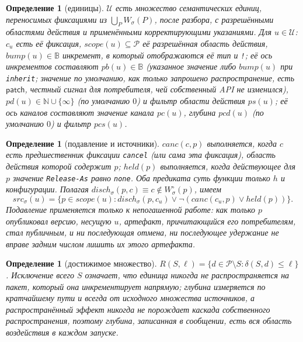 \documentclass[sigconf,nonacm]{acmart}
\theoremstyle{acmplain}
\theoremstyle{acmdefinition}
\newtheorem{definition}[theorem]{Определение}
\theoremstyle{acmplain}
\newcommand{\code}[1]{\texttt{#1}}
\begin{document}
\begin{definition}[единицы]
$\mathcal{U}$ есть множество семантических единиц, переносимых фиксациями из
$\bigcup_P W_\sigma(P)$, после разбора, с разрешёнными областями действия и применёнными
корректирующими указаниями. Для $u \in \mathcal{U}$: $c_u$ есть её фиксация,
$\mathit{scope}(u) \subseteq \mathcal{P}$ её разрешённая область действия,
$\mathit{bump}(u) \in \mathbb{B}$ инкремент, в который отображаются её тип и \code{!};
её ось инкрементов составляют $\mathit{pb}(u) \in \mathbb{B}$ (указанное значение либо
$\mathit{bump}(u)$ при \code{inherit}; значение по умолчанию, как только запрошено
распространение, есть $\mathsf{patch}$, честный сигнал для потребителя, чей
собственный API не изменился), $\mathit{pd}(u) \in \mathbb{N} \cup
\{\infty\}$ (по умолчанию $0$) и фильтр области действия $\mathit{ps}(u)$; её ось
каналов составляют значение канала $\mathit{pc}(u)$, глубина $\mathit{pcd}(u)$
(по умолчанию $0$) и фильтр $\mathit{pcs}(u)$.
\end{definition}

\begin{definition}[подавление и источники]
\label{def:src}
$\mathit{canc}(c,p)$ выполняется, когда $c$ есть предшественник фиксации
\code{cancel} (или сама эта фиксация), область действия которой содержит $p$; $\mathit{held}(p)$
выполняется, когда действующее для $p$ значение \code{Release-As} равно \code{none}. Оба предиката
суть функции только $h$ и конфигурации. Полагая $\mathit{disch}_\sigma(p,c)
\equiv c \notin W^\circ_\sigma(p)$, имеем
\begin{equation}
  \mathit{src}_\sigma(u) = \{ p \in \mathit{scope}(u) :
    \mathit{disch}_\sigma(p,c_u) \lor
    \lnot(\mathit{canc}(c_u,p) \lor \mathit{held}(p)) \}.
  \label{eq:src}
\end{equation}
Подавление применяется только к \emph{непогашенной} работе: как только $p$
опубликовал версию, несущую $u$, артефакт, причитающийся его потребителям,
стал публичным, и ни последующая отмена, ни последующее удержание не вправе задним числом
лишить их этого артефакта.
\end{definition}

\begin{definition}[достижимое множество]
\label{def:reach}
$R(S,\ell) = \{ d \in \mathcal{P} \setminus S : \delta(S,d) \leq \ell
\}$. Исключение всего $S$ означает, что единица никогда не распространяется на пакет,
который она инкрементирует напрямую; глубина измеряется по кратчайшему пути и всегда
от исходного множества источников, а распространённый эффект никогда не порождает
каскада собственного распространения, поэтому глубина, записанная в сообщении, есть вся
область воздействия в каждом запуске.
\end{definition}
\end{document}
